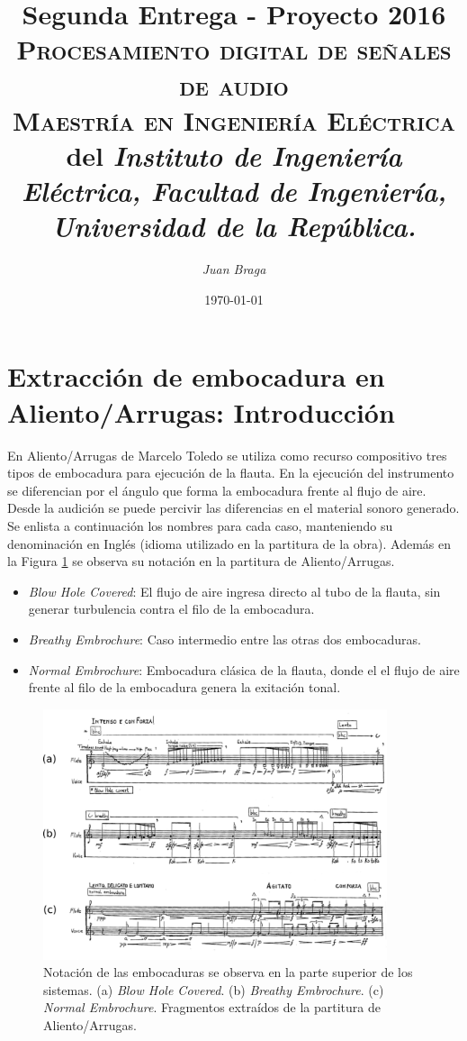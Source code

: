 \documentclass{article}
\title{\textbf{Segunda Entrega - Proyecto 2016}\\\large \textsc{Procesamiento digital de señales de audio}\\
 \textsc{Maestría en Ingeniería Eléctrica} del \textit{Instituto de Ingeniería Eléctrica, Facultad de Ingeniería, Universidad de la República.}}
\author{\textit{Juan Braga}}
\date{\today}
\begin{document}
\maketitle 


\section*{Extracción de embocadura en Aliento/Arrugas: Introducción}
En Aliento/Arrugas de Marcelo Toledo se utiliza como recurso compositivo tres tipos de embocadura para ejecución de la flauta. En la ejecución del instrumento se diferencian por el ángulo que forma la embocadura frente al flujo de aire. Desde la audición se puede percivir las diferencias en el material sonoro generado. Se enlista a continuación los nombres para cada caso, manteniendo su denominación en Inglés (idioma utilizado en la partitura de la obra). Además en la Figura \ref{fig:embocaduras} se observa su notación en la partitura de Aliento/Arrugas.

\begin{itemize} 
  \item \textit{Blow Hole Covered}: El flujo de aire ingresa directo al tubo de la flauta, sin generar turbulencia contra el filo de la embocadura. 
  \item \textit{Breathy Embrochure}: Caso intermedio entre las otras dos embocaduras. 
  \item \textit{Normal Embrochure}: Embocadura clásica de la flauta, donde el el flujo de aire frente al filo de la embocadura genera la exitación tonal.
\end{itemize}
\medskip

\begin{figure}[H]
\begin{center}
\includegraphics[width=0.9\textwidth]{embocaduras} 
\caption{Notación de las embocaduras se observa en la parte superior de los sistemas. (a) \textit{Blow Hole Covered}. (b) \textit{Breathy Embrochure}. (c) \textit{Normal Embrochure}. Fragmentos extraídos de la partitura de Aliento/Arrugas.}
\label{fig:embocaduras}
\end{center}
\end{figure}
\end{document}
